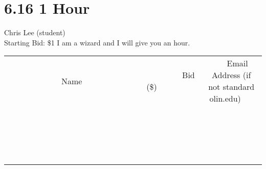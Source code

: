 \documentclass[11pt]{article}
\begin{document}
\section*{6.16 1 Hour}
Chris Lee (student)
\\
Starting Bid: \$1
\newline
I am a wizard and I will give you an hour.
\\[3ex]
\begin{tabular}{c c c}
~~~~~~~~~~~~~Name~~~~~~~~~~~~~ & ~~~~~~~~~Bid (\$)~~~~~~~~~  & ~~~Email Address (if not standard olin.edu)~~~\\
 & & \\
\hline
 & & \\
\hline
 & & \\
\hline
 & & \\
\hline
 & & \\
\hline
 & & \\
\hline
 & & \\
\hline
 & & \\
\hline
 & & \\
\hline
 & & \\
\hline
 & & \\
\hline
 & & \\
\hline
 & & \\
\hline
 & & \\
\hline
 & & \\
\hline
 & & \\
\hline
 & & \\
\hline
 & & \\
\hline
 & & \\
\hline
\end{tabular}
\newpage
\end{document}
